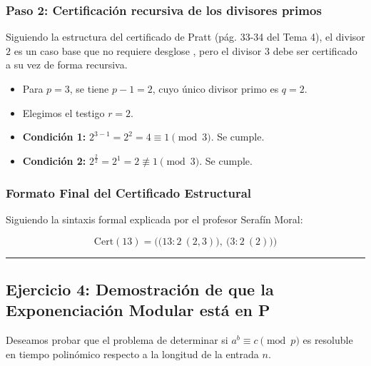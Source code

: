 \documentclass[12pt]{book} %
\begin{document}
\hypertarget{paso-2-certificaciuxf3n-recursiva-de-los-divisores-primos}{%
\subsubsection{Paso 2: Certificación recursiva de los divisores
primos}\label{paso-2-certificaciuxf3n-recursiva-de-los-divisores-primos}}

Siguiendo la estructura del certificado de Pratt (pág. 33-34 del Tema
4), el divisor \(2\) es un caso base que no requiere desglose , pero el
divisor \(3\) debe ser certificado a su vez de forma recursiva.

\begin{itemize}
\item
  Para \(p = 3\), se tiene \(p - 1 = 2\), cuyo único divisor primo es
  \(q = 2\).
\item
  Elegimos el testigo \(r = 2\).
\item
  \textbf{Condición 1:} \(2^{3-1} = 2^2 = 4 \equiv 1 \pmod 3\). Se
  cumple.
\item
  \textbf{Condición 2:}
  \(2^{\frac{2}{2}} = 2^1 = 2 \not\equiv 1 \pmod 3\). Se cumple.
\end{itemize}

\hypertarget{formato-final-del-certificado-estructural}{%
\subsubsection{Formato Final del Certificado
Estructural}\label{formato-final-del-certificado-estructural}}

Siguiendo la sintaxis formal explicada por el profesor Serafín Moral:

\[\text{Cert}(13) = \Big( \big(13 : 2 \ (2, 3)\big), \ \big(3 : 2 \ (2)\big) \Big)\]

\begin{center}\rule{0.5\linewidth}{0.5pt}\end{center}

\hypertarget{ejercicio-4-demostraciuxf3n-de-que-la-exponenciaciuxf3n-modular-estuxe1-en-p}{%
\subsection{Ejercicio 4: Demostración de que la Exponenciación Modular
está en
P}\label{ejercicio-4-demostraciuxf3n-de-que-la-exponenciaciuxf3n-modular-estuxe1-en-p}}

Deseamos probar que el problema de determinar si
\(a^b \equiv c \pmod p\) es resoluble en tiempo polinómico respecto a la
longitud de la entrada \(n\).
\end{document}
